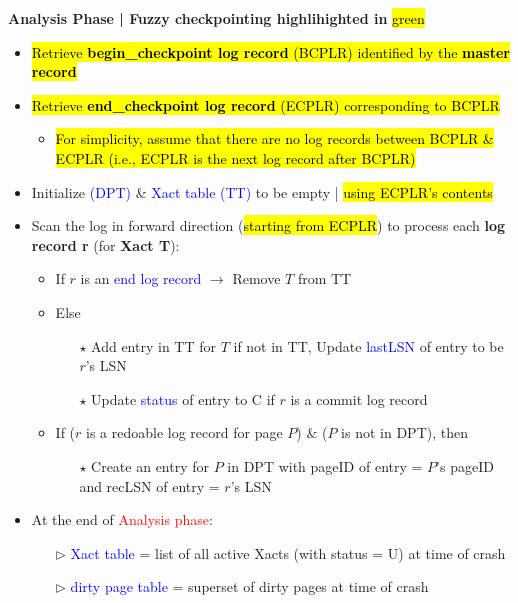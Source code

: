 \documentclass[10pt,landscape]{article}
\newcommand{\1}{\mathmybb{1}}
\begin{document}
\begin{multicols*}{3}
\textbf{Analysis Phase | Fuzzy checkpointing highlihighted in} \hl{green}
\begin{itemize}
    \item {}\hl{Retrieve \textbf{begin\_checkpoint log record} (BCPLR) identified by the \textbf{master record}}
    \item {}\hl{Retrieve \textbf{end\_checkpoint log record} (ECPLR) corresponding to BCPLR}
    \begin{itemize}
        \item {}\hl{For simplicity, assume that there are no log records between BCPLR \& ECPLR (i.e., ECPLR is the next log record after BCPLR)}
    \end{itemize}
    \item Initialize \textcolor{blue}{(DPT)} \& \textcolor{blue}{Xact table (TT)} to be empty | \hl{using ECPLR's contents}
    \item Scan the log in forward direction (\hl{starting from  ECPLR}) to process each \textbf{log record r} (for \textbf{Xact T}):
    \begin{itemize}
        \item If $r$ is an \textcolor{blue}{end log record} $\rightarrow$ Remove $T$ from TT
        \item Else
        \begin{itemize}
            \item[$\star$] Add entry in TT for $T$ if not in TT, Update \textcolor{blue}{lastLSN} of entry to be $r$'s LSN
            \item[$\star$] Update \textcolor{blue}{status} of entry to C if $r$ is a commit log record
        \end{itemize}
        \item If ($r$ is a redoable log record for page $P$) \& ($P$ is not in DPT), then
        \begin{itemize}
            \item[$\star$] Create an entry for $P$ in DPT with pageID of entry = $P$'s pageID and recLSN of entry = $r$'s LSN
        \end{itemize}
    \end{itemize}
    \item At the end of \textcolor{red}{Analysis phase}:
    \begin{itemize}
        \item[$\triangleright$] \textcolor{blue}{Xact table} = list of all active Xacts (with status = U) at time of crash
        \item[$\triangleright$] \textcolor{blue}{dirty page table} = superset of dirty pages at time of crash
    \end{itemize}
\end{itemize}


\end{multicols*}
\end{document}
